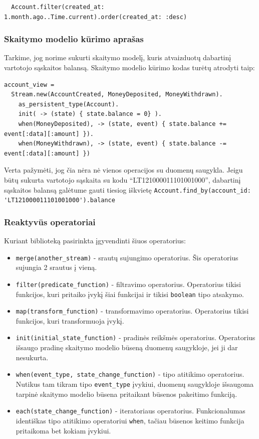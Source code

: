 \begin{lstlisting}
  Account.filter(created_at: 1.month.ago..Time.current).order(created_at: :desc)
\end{lstlisting}

\subsubsection{Skaitymo modelio kūrimo aprašas}

Tarkime, jog norime sukurti skaitymo modelį, kuris atvaizduotų dabartinį vartotojo sąskaitos balansą. Skaitymo modelio kūrimo kodas turėtų atrodyti taip:

\begin{lstlisting}
account_view =
  Stream.new(AccountCreated, MoneyDeposited, MoneyWithdrawn).
    as_persistent_type(Account).
    init( -> (state) { state.balance = 0} ).
    when(MoneyDeposited), -> (state, event) { state.balance += event[:data][:amount] }).
    when(MoneyWithdrawn), -> (state, event) { state.balance -= event[:data][:amount] })
\end{lstlisting}

Verta pažymėti, jog čia nėra nė vienos operacijos su duomenų saugykla. Jeigu būtų sukurta vartotojo sąskaita su kodu ``LT121000011101001000'', dabartinį sąskaitos balansą galėtume gauti tiesiog iškvietę \lstinline|Account.find_by(account_id: 'LT121000011101001000').balance|

\subsubsection{Reaktyvūs operatoriai}

Kuriant biblioteką pasirinkta įgyvendinti šiuos operatorius:

\begin{itemize}
  \item \lstinline|merge(another_stream)| - srautų sujungimo operatorius. Šis operatorius sujungia 2 srautus į vieną.
  \item \lstinline|filter(predicate_function)| - filtravimo operatorius. Operatorius tikisi funkcijos, kuri pritaiko įvykį šiai funkcijai ir tikisi \lstinline|boolean| tipo atsakymo.
  \item \lstinline|map(transform_function)| - transformavimo operatorius. Operatorius tikisi funkcijos, kuri transformuoja įvykį.
  \item \lstinline|init(initial_state_function)| - pradinės reikšmės operatorius. Operatorius išsaugo pradinę skaitymo modelio būseną duomenų saugykloje, jei ji dar nesukurta.
  \item \lstinline|when(event_type, state_change_function)| - tipo atitikimo operatorius. Nutikus tam tikram tipo \lstinline|event_type| įvykiui, duomenų saugykloje išsaugoma tarpinė skaitymo modelio būsena pritaikant būsenos pakeitimo funkciją.
  \item \lstinline|each(state_change_function)| - iteratoriaus operatorius. Funkcionalumas identiškas tipo atitikimo operatoriui \lstinline|when|, tačiau būsenos keitimo funkcija pritaikoma bet kokiam įvykiui.
\end{itemize}


